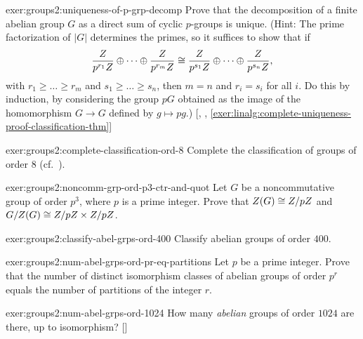\begin{exer}{}{exer:groups2:uniqueness-of-p-grp-decomp}
  \exerused{} Prove that the decomposition of a finite abelian group
  $G$ as a direct sum of cyclic $p$-groups is unique. (Hint: The prime
  factorization of $|G|$ determines the primes, so it suffices to show
  that if
  \[\frac{Z}{p^{r_1}Z} \oplus \dots \oplus
    \frac{Z}{p^{r_m}Z} \cong \frac{Z}{p^{s_1}Z} \oplus \dots
    \oplus \frac{Z}{p^{s_n}Z},\] with $r_1 \geq \dots \geq r_m$ and
  $s_1 \geq \dots \geq s_n$, then $m = n$ and $r_i = s_i$ for all
  $i$. Do this by induction, by considering the group $pG$ obtained as
  the image of the homomorphism $G \to G$ defined by $g \mapsto pg$.)
  [,
  ,
  \ref{exer:linalg:complete-uniqueness-proof-classification-thm}]
\end{exer}
\begin{exer}{}{exer:groups2:complete-classification-ord-8}
  Complete the classification of groups of order $8$ (cf.\
  ).
\end{exer}
\begin{exer}{}{exer:groups2:noncomm-grp-ord-p3-ctr-and-quot}
  Let $G$ be a noncommutative group of order $p^3$, where $p$ is a
  prime integer. Prove that $Z(G) \cong Z/pZ$ and
  $G/Z(G) \cong Z/pZ \times Z/pZ$.
\end{exer}
\begin{exer}{}{exer:groups2:classify-abel-grps-ord-400}
  Classify abelian groups of order $400$.
\end{exer}
\begin{exer}{}{exer:groups2:num-abel-grps-ord-pr-eq-partitions}
  Let $p$ be a prime integer. Prove that the number of distinct
  isomorphism classes of abelian groups of order $p^r$ equals the
  number of partitions of the integer $r$.
\end{exer}
\begin{exer}{}{exer:groups2:num-abel-grps-ord-1024}
  \exerused{} How many \emph{abelian} groups of order $1024$ are
  there, up to isomorphism?
  []
\end{exer}

